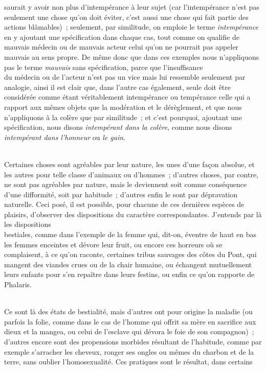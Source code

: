 \documentclass[french,twoside]{book} %
\begin{document}
saurait y avoir non plus d’intempérance à leur sujet (car l’intempérance n’est pas seulement une chose qu’on doit éviter, c’est aussi une chose qui fait partie des actions blâmables) ; seulement, par similitude, on emploie le terme {\itshape intempérance} en y ajoutant une spécification dans chaque cas, tout comme on qualifie de mauvais médecin ou de mauvais acteur celui qu’on ne pourrait pas appeler mauvais au sens propre. De même donc que dans ces exemples nous n’appliquons pas le terme {\itshape mauvais} sans spécification, parce que l’insuffisance \\
du médecin ou de l’acteur n’est pas un vice mais lui ressemble seulement par analogie, ainsi il est clair que, dans l’autre cas également, seule doit être considérée comme étant véritablement intempérance ou tempérance celle qui a rapport aux mêmes objets que la modération et le dérèglement, et que nous n’appliquons à la colère que par similitude ; et c’est pourquoi, ajoutant une spécification, nous disons {\itshape intempérant dans la colère}, comme nous disons {\itshape intempérant dans l’honneur} ou {\itshape le gain}.\par
\\
Certaines choses sont agréables par leur nature, les unes d’une façon absolue, et les autres pour telle classe d’animaux ou d’hommes ; d’autres choses, par contre, ne sont pas agréables par nature, mais le deviennent soit comme conséquence d’une difformité, soit par habitude ; d’autres enfin le sont par dépravation naturelle. Ceci posé, il est possible, pour chacune de ces dernières espèces de plaisirs, d’observer des dispositions du caractère correspondantes. J’entends par là les dispositions \\
bestiales, comme dans l’exemple de la femme qui, dit-on, éventre de haut en bas les femmes enceintes et dévore leur fruit, ou encore ces horreurs où se complaisent, à ce qu’on raconte, certaines tribus sauvages des côtes du Pont, qui mangent des viandes crues ou de la chair humaine, ou échangent mutuellement leurs enfants pour s’en repaître dans leurs festins, ou enfin ce qu’on rapporte de Phalaris.\par
\\
Ce sont là des états de bestialité, mais d’autres ont pour origine la maladie (ou parfois la folie, comme dans le cas de l’homme qui offrit sa mère en sacrifice aux dieux et la mangea, ou celui de l’esclave qui dévora le foie de son compagnon) ; d’autres encore sont des propensions morbides résultant de l’habitude, comme par exemple s’arracher les cheveux, ronger ses ongles ou mêmes du charbon et de la terre, sans oublier l’homosexualité. Ces pratiques sont le résultat, dans certains \\
\end{document}
